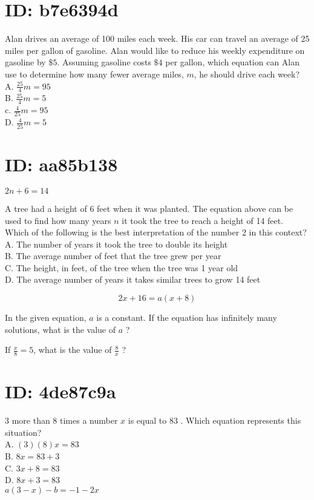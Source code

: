 \section*{ID: b7e6394d}
Alan drives an average of 100 miles each week. His car can travel an average of 25 miles per gallon of gasoline. Alan would like to reduce his weekly expenditure on gasoline by $\$ 5$. Assuming gasoline costs $\$ 4$ per gallon, which equation can Alan use to determine how many fewer average miles, $m$, he should drive each week?\\
A. $\frac{25}{4} m=95$\\
B. $\frac{25}{4} m=5$\\
c. $\frac{4}{25} m=95$\\
D. $\frac{4}{25} m=5$

\section*{ID: aa85b138}
$2 n+6=14$

A tree had a height of 6 feet when it was planted. The equation above can be used to find how many years $n$ it took the tree to reach a height of 14 feet. Which of the following is the best interpretation of the number 2 in this context?\\
A. The number of years it took the tree to double its height\\
B. The average number of feet that the tree grew per year\\
C. The height, in feet, of the tree when the tree was 1 year old\\
D. The average number of years it takes similar trees to grow 14 feet

$$
2 x+16=a(x+8)
$$

In the given equation, $a$ is a constant. If the equation has infinitely many solutions, what is the value of $a$ ?

If $\frac{x}{8}=5$, what is the value of $\frac{8}{x}$ ?






\section*{ID: 4de87c9a}
3 more than 8 times a number $x$ is equal to 83 . Which equation represents this situation?\\
A. $(3)(8) x=83$\\
B. $8 x=83+3$\\
C. $3 x+8=83$\\
D. $8 x+3=83$\\
$a(3-x)-b=-1-2 x$

